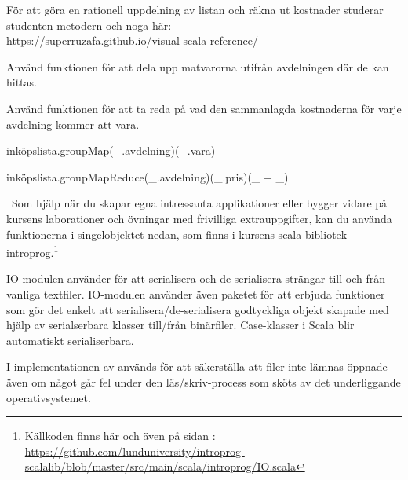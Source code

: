 \noindent För att göra en rationell uppdelning av listan och räkna ut kostnader studerar studenten metodern  och   noga här: \\ \url{https://superruzafa.github.io/visual-scala-reference/}


\Subtask Använd funktionen  för att dela upp matvarorna utifrån avdelningen där de kan hittas.

\Subtask Använd funktionen  för att ta reda på vad den sammanlagda kostnaderna för varje avdelning kommer att vara. 

\SOLUTION

\SubtaskSolved

\begin{Code}
inköpslista.groupMap(_.avdelning)(_.vara)
\end{Code}

\SubtaskSolved

\begin{Code}
inköpslista.groupMapReduce(_.avdelning)(_.pris)(_ + _)
\end{Code}

\QUESTEND




\QUESTBEGIN

\Task \what~Som hjälp när du skapar egna intressanta applikationer eller bygger vidare på kursens laborationer och övningar med frivilliga extrauppgifter, kan du använda funktionerna i singelobjektet  nedan, som finns i kursens scala-bibliotek \href{https://fileadmin.cs.lth.se/pgk/api}{introprog}.\footnote{Källkoden finns här och även på sidan \pageref{disk-access-code}:\\ \href{https://github.com/lunduniversity/introprog/blob/master/compendium/workspace/introprog/src/main/scala/introprog/IO.scala}{https://github.com/lunduniversity/introprog-scalalib/blob/master/src/main/scala/introprog/IO.scala}}

IO-modulen använder  för att serialisera och de-serialisera strängar till och från vanliga textfiler. IO-modulen använder även paketet  för att erbjuda funktioner som gör det enkelt att serialisera/de-serialisera godtyckliga objekt skapade med hjälp av serialserbara klasser till/från binärfiler. Case-klasser i Scala blir automatiskt serialiserbara.

I implementationen av  används  för att säkerställa att filer inte lämnas öppnade även om något går fel under den läs/skriv-process som sköts av det underliggande operativsystemet.

